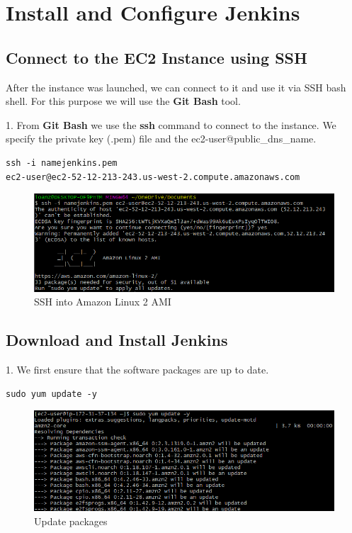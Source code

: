 \documentclass[12pt,a4paper,twoside]{article}
\begin{document}
\section{Install and Configure Jenkins}


\subsection{Connect to the EC2 Instance using SSH}


After the instance was launched, we can connect to it and use it via SSH bash shell. For this purpose we will use the \textbf{Git Bash} tool.


1. From \textbf{Git Bash} we use the \textbf{ssh} command to connect to the instance. We specify the private key (.pem) file and the ec2-user@public\_dns\_name.

\begin{verbatim}
ssh -i namejenkins.pem 
ec2-user@ec2-52-12-213-243.us-west-2.compute.amazonaws.com
\end{verbatim}

\begin{figure}[H]
    \centering
        \includegraphics[width=15cm]{images-aws/13-ssh-connect.png}
        \caption{SSH into Amazon Linux 2 AMI}
\end{figure}


\subsection{Download and Install Jenkins}


1. We first ensure that the software packages are up to date.


\begin{verbatim}
sudo yum update -y
\end{verbatim}


\begin{figure}[H]
    \centering
        \includegraphics[width=15cm]{images-aws/14-yum-update.png}
        \caption{Update packages}
\end{figure}
\end{document}

